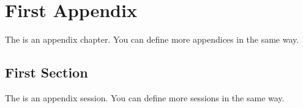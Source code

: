 \chapter{First Appendix}
The is an appendix chapter. You can define more appendices in the same way.
\section{First Section}
The is an appendix session. You can define more sessions in the same way. 
